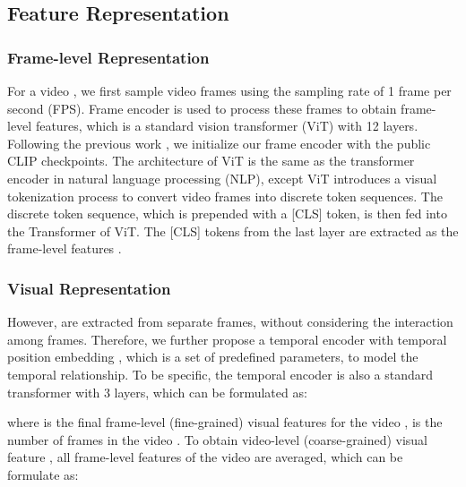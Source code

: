 \documentclass[sigconf]{acmart}
\begin{document}
\subsection{Feature Representation} \label{sec:feature}

\subsubsection{Frame-level Representation}
For a video , we first sample video frames using the sampling rate of 1 frame per second (FPS). Frame encoder is used to process these frames to obtain frame-level features, which is a standard vision transformer (ViT) with 12 layers. Following the previous work \cite{luo2021clip4clip}, we initialize our frame encoder with the public CLIP \cite{radford2021learning} checkpoints. The architecture of ViT is the same as the transformer \cite{vaswani2017attention} encoder in natural language processing (NLP), except ViT introduces a visual tokenization process to convert video frames into discrete token sequences. The discrete token sequence, which is prepended with a [CLS] token, is then fed into the Transformer of ViT. The [CLS] tokens from the last layer are extracted as the frame-level features . 

\subsubsection{Visual Representation}
However,  are extracted from separate frames, without considering the interaction among frames. Therefore, we further propose a temporal encoder with temporal position embedding , which is a set of predefined parameters, to model the temporal relationship. To be specific, the temporal encoder is also a standard transformer with 3 layers, which can be formulated as:

where  is the final frame-level (fine-grained) visual features for the video ,  is the number of frames in the video . To obtain video-level (coarse-grained) visual feature , all frame-level features of the video   are averaged, which can be formulate as:
\end{document}
